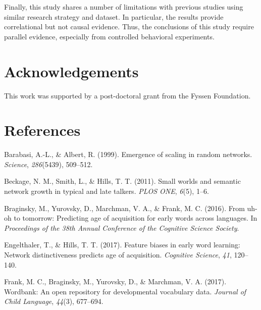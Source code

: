 \documentclass[10pt, letterpaper]{article}
\begin{document}
Finally, this study shares a number of limitations with previous studies
using similar research strategy and dataset. In particular, the results
provide correlational but not causal evidence. Thus, the conclusions of
this study require parallel evidence, especially from controlled
behavioral experiments.

\vspace{1em}

\vspace{1em}

\section{Acknowledgements}\label{acknowledgements}

This work was supported by a post-doctoral grant from the Fyssen
Foundation.

\section{References}\label{references}

\setlength{\parindent}{-0.1in} \setlength{\leftskip}{0.125in} \noindent

\hypertarget{refs}{}
\hypertarget{ref-barabasi99}{}
Barabasi, A.-L., \& Albert, R. (1999). Emergence of scaling in random
networks. \emph{Science}, \emph{286}(5439), 509--512.

\hypertarget{ref-beckage2011}{}
Beckage, N. M., Smith, L., \& Hills, T. T. (2011). Small worlds and
semantic network growth in typical and late talkers. \emph{PLOS ONE},
\emph{6}(5), 1--6.

\hypertarget{ref-braginsky2016}{}
Braginsky, M., Yurovsky, D., Marchman, V. A., \& Frank, M. C. (2016).
From uh-oh to tomorrow: Predicting age of acquisition for early words
across languages. In \emph{Proceedings of the 38th Annual Conference of
the Cognitive Science Society}.

\hypertarget{ref-engelthaler2017}{}
Engelthaler, T., \& Hills, T. T. (2017). Feature biases in early word
learning: Network distinctiveness predicts age of acquisition.
\emph{Cognitive Science}, \emph{41}, 120--140.

\hypertarget{ref-frank2017}{}
Frank, M. C., Braginsky, M., Yurovsky, D., \& Marchman, V. A. (2017).
Wordbank: An open repository for developmental vocabulary data.
\emph{Journal of Child Language}, \emph{44}(3), 677--694.
\end{document}
